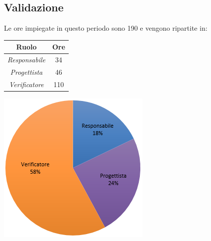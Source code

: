 \subsection{Validazione}
Le ore impiegate in questo periodo sono 190 e vengono ripartite in:
\begin{center}
  \centering
  \begin{tabular}{|c|c|}
    \hline
    \textbf{Ruolo} & \textbf{Ore} \\
    \hline
     \emph{Responsabile}  & 34 \\
    \hline  \emph{Progettista}  & 46 \\
    \hline  \emph{Verificatore}  & 110 \\
    \hline
  \end{tabular}
  \includegraphics[scale=0.7]{img/grafico6.png}
\end{center}

